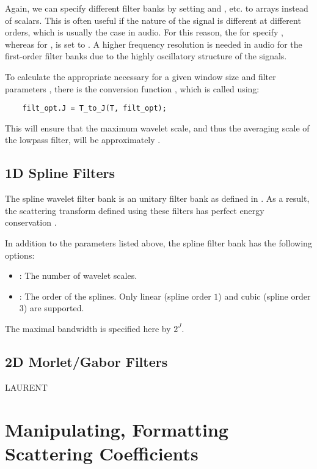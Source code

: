 \documentclass[twocolumn]{article}
\begin{document}
Again, we can specify different filter banks by setting  and , etc. to arrays instead of scalars. This is often useful if the nature of the signal is different at different orders, which is usually the case in audio. For this reason, the  for  specify , whereas for ,  is set to . A higher frequency resolution is needed in audio for the first-order filter banks due to the highly oscillatory structure of the signals.

To calculate the appropriate  necessary for a given window size  and filter parameters , there is the conversion function , which is called using:
\begin{lstlisting}
	filt_opt.J = T_to_J(T, filt_opt);
\end{lstlisting}
This will ensure that the maximum wavelet scale, and thus the averaging scale of the lowpass filter, will be approximately .

\subsection{1D Spline Filters}
The spline wavelet filter bank is an unitary filter bank as defined in \cite{mallatbook}. As a result, the scattering transform defined using these filters has perfect energy conservation \cite{stephane}.

In addition to the parameters listed above, the spline filter bank has the following options:
\begin{itemize}
	\item {}: The number of wavelet scales.
	\item {}: The order of the splines. Only linear (spline order $1$) and cubic (spline order $3$) are supported.
\end{itemize}
The maximal bandwidth is specified here by $2^J$.

\subsection{2D Morlet/Gabor Filters}

LAURENT

\section{Manipulating, Formatting Scattering Coefficients}
\end{document}
